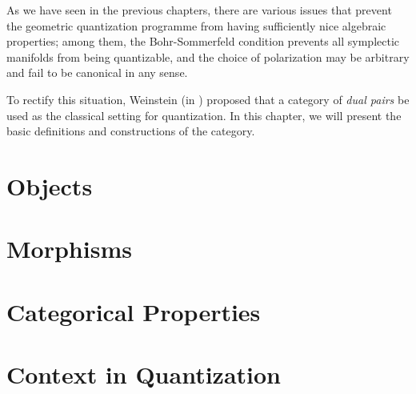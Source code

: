 As we have seen in the previous chapters, there are various issues that prevent the geometric quantization programme from having sufficiently nice algebraic properties; among them, the Bohr-Sommerfeld condition prevents all symplectic manifolds from being quantizable, and the choice of polarization may be arbitrary and fail to be canonical in any sense.

To rectify this situation, Weinstein (in \cite{weinsteindualpairs}) proposed that a category of \emph{dual pairs} be used as the classical setting for quantization. In this chapter, we will present the basic definitions and constructions of the category.

\section{Objects}

\section{Morphisms}

\section{Categorical Properties}

\section{Context in Quantization}




